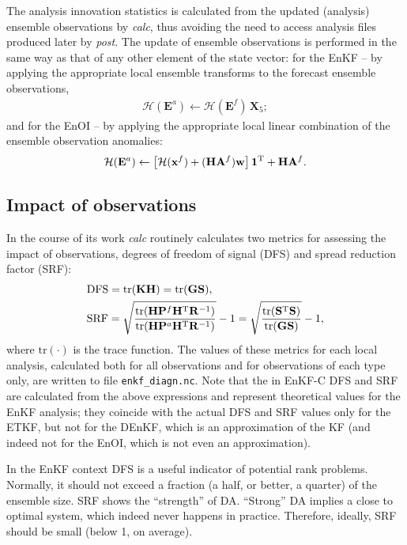 \documentclass[11pt]{report}
\newcommand{\mb} {\mathbf}
\newcommand{\T}{^{\tiny \mathrm T}}
\begin{document}
The analysis innovation statistics is calculated from the updated (analysis) ensemble observations by \emph{calc}, thus avoiding the need to access analysis files produced later by \emph{post}.
The update of ensemble observations is performed in the same way as that of any other element of the state vector:
for the EnKF -- by applying the appropriate local ensemble transforms to the forecast ensemble observations,
\begin{align*}
  \mathcal H (\mb E^a) \leftarrow \mathcal H (\mb E^f) \, \mb X_5;
\end{align*}
and for the EnOI -- by applying the appropriate local linear combination of the ensemble observation anomalies:
\begin{align*}
  \mathcal H (\mb E^a) \leftarrow \left[ \mathcal H (\mb x^f) + (\mb H \mb A^f) \mb w\right] \mb 1\T + \mb H \mb A^f.
\end{align*}

\subsection{Impact of observations}

In the course of its work \emph{calc} routinely calculates two metrics for assessing the impact of observations, degrees of freedom of signal (DFS) and spread reduction factor (SRF):
\begin{align*}
  & \mathrm{DFS} = \mathrm{tr}(\mb K \mb H) = \mathrm{tr}(\mb G \mb S), \\
  & \mathrm{SRF} = \sqrt{\frac{\mathrm{tr}(\mb H \mb P^f \mb H\T \mb R^{-1})}{\mathrm{tr}(\mb H \mb P^a \mb H\T \mb R^{-1})}} - 1 = \sqrt{\frac{\mathrm{tr}(\mb S\T \mb S)}{\mathrm{tr}(\mb G \mb S)}} - 1,
\end{align*}
where $\mathrm{tr}(\cdot)$ is the trace function.
The values of these metrics for each local analysis, calculated both for all observations and for observations of each type only, are written to file \verb|enkf_diagn.nc|.
Note that the in EnKF-C DFS and SRF are calculated from the above expressions and represent theoretical values for the EnKF analysis; they coincide with the actual DFS and SRF values only for the ETKF, but not for the DEnKF, which is an approximation of the KF (and indeed not for the EnOI, which is not even an approximation).

In the EnKF context DFS is a useful indicator of potential rank problems.
Normally, it should not exceed a fraction (a half, or better, a quarter) of the ensemble size.
SRF shows the ``strength'' of DA.
``Strong'' DA implies a close to optimal system, which indeed never happens in practice.
Therefore, ideally, SRF should be small (below 1, on average).
\end{document}
